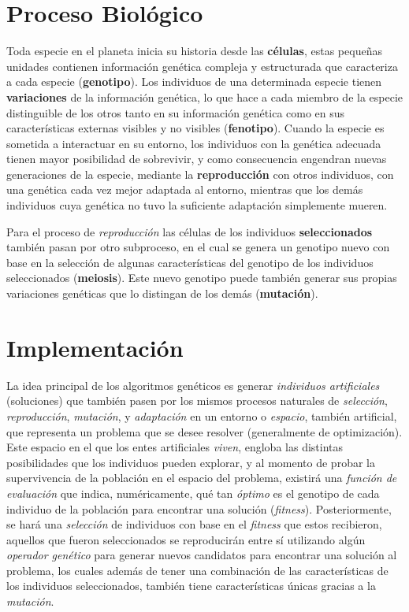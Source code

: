 \documentclass[a4paper, 12pt]{article}
\begin{document}
\section{Proceso Biológico}
Toda especie en el planeta inicia su historia desde las \textbf{células}, estas pequeñas unidades contienen información genética compleja y estructurada que caracteriza a cada especie (\textbf{genotipo}). Los individuos de una determinada especie tienen \textbf{variaciones} de la información genética, lo que hace a cada miembro de la especie distinguible de los otros tanto en su información genética como en sus características externas visibles y no visibles (\textbf{fenotipo}). Cuando la especie es sometida a interactuar en su entorno, los individuos con la genética adecuada tienen mayor posibilidad de sobrevivir, y como consecuencia engendran nuevas generaciones de la especie, mediante la \textbf{reproducción} con otros individuos, con una genética cada vez mejor adaptada al entorno, mientras que los demás individuos cuya genética no tuvo la suficiente adaptación simplemente mueren.

Para el proceso de \emph{reproducción} las células de los individuos \textbf{seleccionados} también pasan por otro subproceso, en el cual se genera un genotipo nuevo con base en la selección de algunas características del genotipo de los individuos seleccionados (\textbf{meiosis}). Este nuevo genotipo puede también generar sus propias variaciones genéticas que lo distingan de los demás (\textbf{mutación}).

\section{Implementación}
La idea principal de los algoritmos genéticos es generar \emph{individuos artificiales} (soluciones) que también pasen por los mismos procesos naturales de \emph{selección}, \emph{reproducción}, \emph{mutación}, y \emph{adaptación} en un entorno o \emph{espacio}, también artificial, que representa un problema que se desee resolver (generalmente de optimización). Este espacio en el que los entes artificiales \emph{viven}, engloba las distintas posibilidades que los individuos pueden explorar, y al momento de probar la supervivencia de la población en el espacio del problema, existirá una \emph{función de evaluación} que indica, numéricamente, qué tan \emph{óptimo} es el genotipo de cada individuo de la población para encontrar una solución (\emph{fitness}). Posteriormente, se hará una \emph{selección} de individuos con base en el \emph{fitness} que estos recibieron, aquellos que fueron seleccionados se reproducirán entre sí utilizando algún \emph{operador genético} para generar nuevos candidatos para encontrar una solución al problema, los cuales además de tener una combinación de las características de los individuos seleccionados, también tiene características únicas gracias a la \emph{mutación}.
\end{document}
